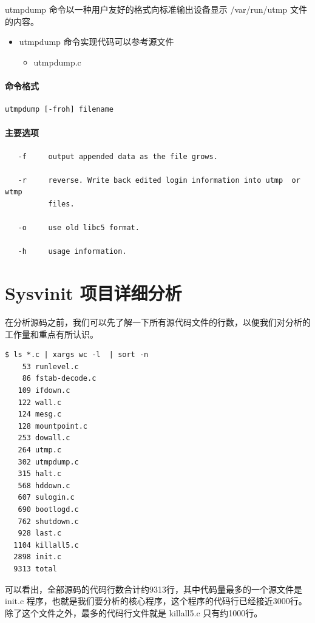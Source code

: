 utmpdump 命令以一种用户友好的格式向标准输出设备显示 /var/run/utmp
文件的内容。

\begin{itemize}
\item
  utmpdump 命令实现代码可以参考源文件
  \begin{itemize}
  \item
    utmpdump.c
  \end{itemize}
\end{itemize}
\subsubsection{命令格式}

{\begin{shaded}\begin{verbatim}
utmpdump [-froh] filename
\end{verbatim}\end{shaded}}
\subsubsection{主要选项}

{\begin{shaded}\begin{verbatim}
   -f     output appended data as the file grows.

   -r     reverse. Write back edited login information into utmp  or  wtmp
          files.

   -o     use old libc5 format.

   -h     usage information.
\end{verbatim}\end{shaded}}
\chapter{Sysvinit 项目详细分析}

在分析源码之前，我们可以先了解一下所有源代码文件的行数，以便我们对分析的工作量和重点有所认识。

{\begin{shaded}\begin{verbatim}
$ ls *.c | xargs wc -l  | sort -n
    53 runlevel.c
    86 fstab-decode.c
   109 ifdown.c
   122 wall.c
   124 mesg.c
   128 mountpoint.c
   253 dowall.c
   264 utmp.c
   302 utmpdump.c
   315 halt.c
   568 hddown.c
   607 sulogin.c
   690 bootlogd.c
   762 shutdown.c
   928 last.c
  1104 killall5.c
  2898 init.c
  9313 total
\end{verbatim}\end{shaded}}
可以看出，全部源码的代码行数合计约9313行，其中代码量最多的一个源文件是
init.c
程序，也就是我们要分析的核心程序，这个程序的代码行已经接近3000行。除了这个文件之外，最多的代码行文件就是
killall5.c 只有约1000行。

